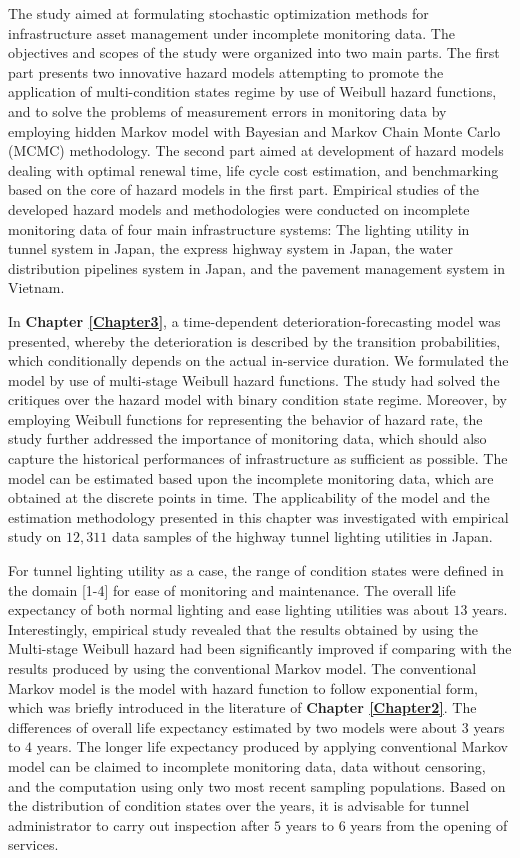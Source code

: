The study aimed at formulating stochastic optimization methods for infrastructure asset management under incomplete monitoring data. The objectives and scopes of the study were organized into two main parts. The first part presents two innovative hazard models attempting to promote the application of multi-condition states regime by use of Weibull hazard functions, and to solve the problems of measurement errors in monitoring data by employing hidden Markov model with Bayesian and Markov Chain Monte Carlo (MCMC) methodology. The second part aimed at development of hazard models dealing with optimal renewal time, life cycle cost estimation, and benchmarking based on the core of hazard models in the first part. Empirical studies of the developed hazard models and methodologies were conducted on incomplete monitoring data of four main infrastructure systems: The lighting utility in tunnel system in Japan, the express highway system in Japan, the water distribution pipelines system in Japan, and the pavement management system in Vietnam.

In \textbf{Chapter \ref{Chapter3}}, a time-dependent deterioration-forecasting model was presented, whereby the deterioration is described by the transition probabilities, which conditionally depends on the actual in-service duration. We formulated the model by use of multi-stage Weibull hazard functions. The study had solved the critiques over the hazard model with binary condition state regime. Moreover, by employing Weibull functions for representing the behavior of hazard rate, the study further addressed the importance of monitoring data, which should also capture the historical performances of infrastructure as sufficient as possible. The model can be estimated based upon the incomplete monitoring data, which are obtained at the discrete points in time. The applicability of the model and the estimation methodology presented in this chapter was investigated with empirical study on $12,311$ data samples of the highway tunnel lighting utilities in Japan.

For tunnel lighting utility as a case, the range of condition states were defined in the domain [1-4] for ease of monitoring and maintenance. The overall life expectancy of both normal lighting and ease lighting utilities was about $13$ years. Interestingly, empirical study revealed that the results obtained by using the Multi-stage Weibull hazard had been significantly improved if comparing with the results produced by using the conventional Markov model. The conventional Markov model is the model with hazard function to follow exponential form, which was briefly introduced in the literature of \textbf{Chapter \ref{Chapter2}}. The differences of overall life expectancy estimated by two models were about $3$ years to $4$ years. The longer life expectancy produced by applying conventional Markov model can be claimed to incomplete monitoring data, data without censoring, and the computation using only two most recent sampling populations. Based on the distribution of condition states over the years, it is advisable for tunnel administrator to carry out  inspection after $5$ years to $6$ years from the opening of services.


